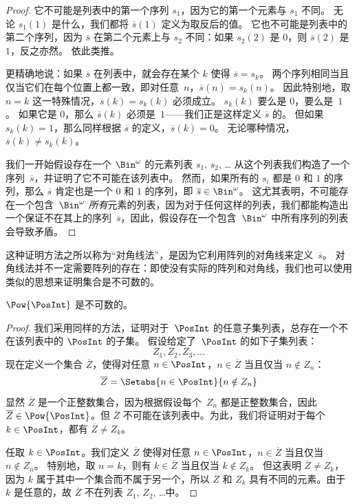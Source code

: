 \documentclass[../../../include/open-logic-section]{subfiles}
\begin{document}
\begin{proof}
它不可能是列表中的第一个序列 $s_1$，因为它的第一个元素与 $s_1$ 不同。
无论 $s_1(1)$ 是什么，我们都将 $\overline{s}(1)$ 定义为取反后的值。
它也不可能是列表中的第二个序列，因为 $\overline{s}$ 在第二个元素上与 $s_2$ 不同：如果 $s_2(2)$ 是 $0$，则 $\overline{s}(2)$ 是 $1$，反之亦然。
依此类推。

更精确地说：如果 $\overline{s}$ 在列表中，就会存在某个 $k$ 使得 $\overline{s} = s_{k}$。
两个序列相同当且仅当它们在每个位置上都一致，即对任意~$n$，$\overline{s}(n) =
s_{k}(n)$。
因此特别地，取 $n = k$ 这一特殊情况，$\overline{s}(k) = s_{k}(k)$ 必须成立。
$s_k(k)$ 要么是 $0$，要么是~$1$。
如果它是 $0$，那么 $\overline{s}(k)$ 必须是~$1$——我们正是这样定义 $\overline{s}$ 的。
但如果 $s_k(k) = 1$，那么同样根据 $\overline{s}$ 的定义，$\overline{s}(k) = 0$。
无论哪种情况，$\overline{s}(k) \neq s_{k}(k)$。

我们一开始假设存在一个 $\Bin^\omega$ 的元素列表 $s_1$, $s_2$, \dots{}
从这个列表我们构造了一个序列~$\overline{s}$，并证明了它不可能在该列表中。
然而，如果所有的 $s_i$ 都是 $0$ 和 $1$ 的序列，那么 $\overline{s}$ 肯定也是一个 $0$ 和 $1$ 的序列，即 $\overline{s} \in \Bin^\omega$。
这尤其表明，不可能存在一个包含~$\Bin^\omega$ \emph{所有}元素的列表，因为对于任何这样的列表，我们都能构造出一个保证不在其上的序列~$\overline{s}$，因此，假设存在一个包含~$\Bin^\omega$ 中所有序列的列表会导致矛盾。
\end{proof}

\begin{explain}
这种证明方法之所以称为“对角线法”，是因为它利用阵列的对角线来定义~$\overline{s}$。
对角线法并不一定需要阵列的存在：即使没有实际的阵列和对角线，我们也可以使用类似的思想来证明集合是不可数的。
\end{explain}

\begin{thm}
$\Pow{\PosInt}$ 是不可数的。
\end{thm}

\begin{proof}
我们采用同样的方法，证明对于~$\PosInt$ 的任意子集列表，总存在一个不在该列表中的 $\PosInt$ 的子集。
假设给定了~$\PosInt$ 的如下子集列表：
\[
Z_{1}, Z_{2}, Z_{3}, \dots
\]
现在定义一个集合 $\overline{Z}$，使得对任意 $n \in \PosInt$，$n \in \overline{Z}$ 当且仅当 $n \notin Z_{n}$：
\[
\overline{Z} = \Setabs{n \in \PosInt}{n \notin Z_n}
\]
显然 $\overline{Z}$ 是一个正整数集合，因为根据假设每个~$Z_n$ 都是正整数集合，因此 $\overline{Z} \in \Pow{\PosInt}$。但 $\overline{Z}$ 不可能在该列表中。为此，我们将证明对于每个 $k \in \PosInt$，都有 $\overline{Z} \neq Z_k$。

任取 $k \in \PosInt$。我们定义 $\overline{Z}$ 使得对任意 $n \in \PosInt$，$n \in \overline{Z}$ 当且仅当 $n \notin Z_n$。
特别地，取 $n=k$，则有 $k \in \overline{Z}$ 当且仅当 $k \notin Z_k$。
但这表明 $\overline{Z} \neq Z_k$，因为 $k$ 属于其中一个集合而不属于另一个，所以 $\overline{Z}$ 和 $Z_k$ 具有不同的元素。由于 $k$ 是任意的，故 $\overline{Z}$ 不在列表 $Z_1$, $Z_2$, \dots 中。
\end{proof}
\end{document}
